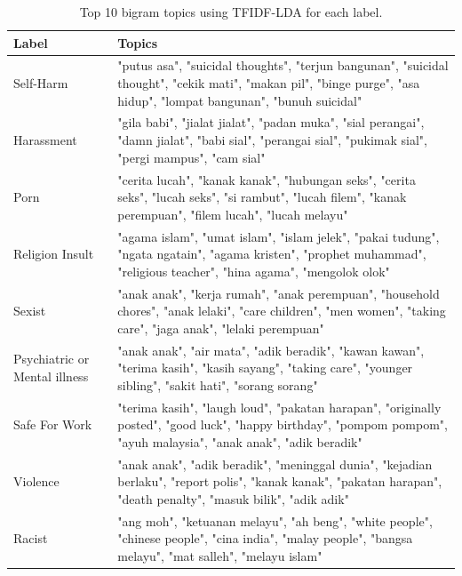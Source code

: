 \documentclass[preprint]{article}
\begin{document}
\begin{table}[h]
  \centering
  \begin{tabularx}{\textwidth}{|X|X|}
    \hline
    \textbf{Label}                & \textbf{Topics}                                                                                                                                                      \\
    \hline
    Self-Harm                     & "putus asa", "suicidal thoughts", "terjun bangunan", "suicidal thought", "cekik mati", "makan pil", "binge purge", "asa hidup", "lompat bangunan", "bunuh suicidal"  \\
    Harassment                    & "gila babi", "jialat jialat", "padan muka", "sial perangai", "damn jialat", "babi sial", "perangai sial", "pukimak sial", "pergi mampus", "cam sial"                 \\
    Porn                          & "cerita lucah", "kanak kanak", "hubungan seks", "cerita seks", "lucah seks", "si rambut", "lucah filem", "kanak perempuan", "filem lucah", "lucah melayu"            \\
    Religion Insult               & "agama islam", "umat islam", "islam jelek", "pakai tudung", "ngata ngatain", "agama kristen", "prophet muhammad", "religious teacher", "hina agama", "mengolok olok" \\
    Sexist                        & "anak anak", "kerja rumah", "anak perempuan", "household chores", "anak lelaki", "care children", "men women", "taking care", "jaga anak", "lelaki perempuan"        \\
    Psychiatric or Mental illness & "anak anak", "air mata", "adik beradik", "kawan kawan", "terima kasih", "kasih sayang", "taking care", "younger sibling", "sakit hati", "sorang sorang"              \\
    Safe For Work                 & "terima kasih", "laugh loud", "pakatan harapan", "originally posted", "good luck", "happy birthday", "pompom pompom", "ayuh malaysia", "anak anak", "adik beradik"   \\
    Violence                      & "anak anak", "adik beradik", "meninggal dunia", "kejadian berlaku", "report polis", "kanak kanak", "pakatan harapan", "death penalty", "masuk bilik", "adik adik"    \\
    Racist                        & "ang moh", "ketuanan melayu", "ah beng", "white people", "chinese people", "cina india", "malay people", "bangsa melayu", "mat salleh", "melayu islam"               \\
    \hline
  \end{tabularx}
  \caption{Top 10 bigram topics using TFIDF-LDA for each label.}
  \label{table:bigram-topics}
\end{table}
\end{document}
